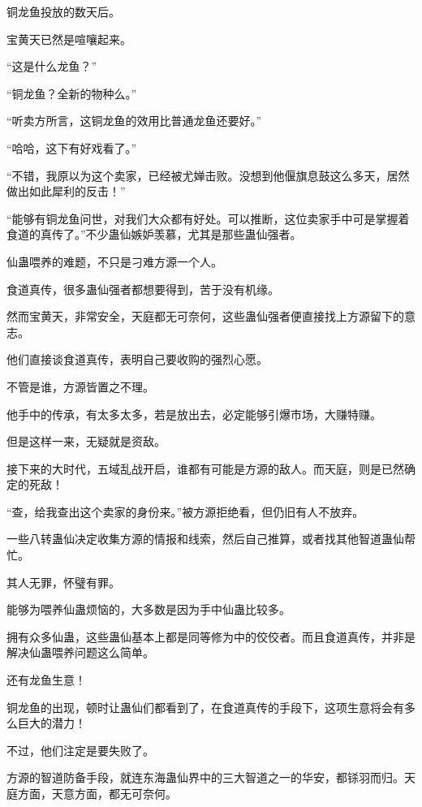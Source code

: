 
\begin{this_body}



铜龙鱼投放的数天后。

宝黄天已然是喧嚷起来。

“这是什么龙鱼？”

“铜龙鱼？全新的物种么。”

“听卖方所言，这铜龙鱼的效用比普通龙鱼还要好。”

“哈哈，这下有好戏看了。”

“不错，我原以为这个卖家，已经被尤婵击败。没想到他偃旗息鼓这么多天，居然做出如此犀利的反击！”

“能够有铜龙鱼问世，对我们大众都有好处。可以推断，这位卖家手中可是掌握着食道的真传了。”不少蛊仙嫉妒羡慕，尤其是那些蛊仙强者。

仙蛊喂养的难题，不只是刁难方源一个人。

食道真传，很多蛊仙强者都想要得到，苦于没有机缘。

然而宝黄天，非常安全，天庭都无可奈何，这些蛊仙强者便直接找上方源留下的意志。

他们直接谈食道真传，表明自己要收购的强烈心愿。

不管是谁，方源皆置之不理。

他手中的传承，有太多太多，若是放出去，必定能够引爆市场，大赚特赚。

但是这样一来，无疑就是资敌。

接下来的大时代，五域乱战开启，谁都有可能是方源的敌人。而天庭，则是已然确定的死敌！

“查，给我查出这个卖家的身份来。”被方源拒绝看，但仍旧有人不放弃。

一些八转蛊仙决定收集方源的情报和线索，然后自己推算，或者找其他智道蛊仙帮忙。

其人无罪，怀璧有罪。

能够为喂养仙蛊烦恼的，大多数是因为手中仙蛊比较多。

拥有众多仙蛊，这些蛊仙基本上都是同等修为中的佼佼者。而且食道真传，并非是解决仙蛊喂养问题这么简单。

还有龙鱼生意！

铜龙鱼的出现，顿时让蛊仙们都看到了，在食道真传的手段下，这项生意将会有多么巨大的潜力！

不过，他们注定是要失败了。

方源的智道防备手段，就连东海蛊仙界中的三大智道之一的华安，都铩羽而归。天庭方面，天意方面，都无可奈何。


\end{this_body}
